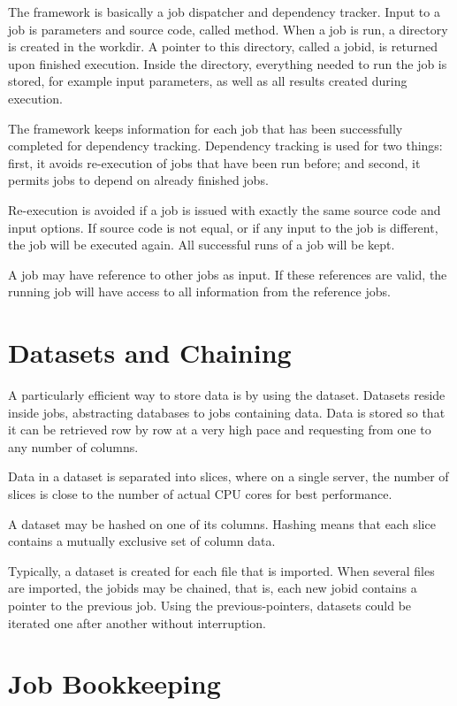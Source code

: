 The framework is basically a job dispatcher and dependency tracker.
Input to a job is parameters and source code, called method.  When a
job is run, a directory is created in the workdir.  A pointer to this
directory, called a jobid, is returned upon finished execution.
Inside the directory, everything needed to run the job is stored, for
example input parameters, as well as all results created during
execution.

The framework keeps information for each job that has been
successfully completed for dependency tracking.  Dependency tracking
is used for two things: first, it avoids re-execution of jobs that
have been run before; and second, it permits jobs to depend on already
finished jobs.

Re-execution is avoided if a job is issued with exactly the same
source code and input options.  If source code is not equal, or if any
input to the job is different, the job will be executed again.  All
successful runs of a job will be kept.

A job may have reference to other jobs as input.  If these references
are valid, the running job will have access to all information from
the reference jobs.



\section{Datasets and Chaining}

A particularly efficient way to store data is by using the dataset.
Datasets reside inside jobs, abstracting databases to jobs containing
data.  Data is stored so that it can be retrieved row by row at a very
high pace and requesting from one to any number of columns.

Data in a dataset is separated into slices, where on a single server,
the number of slices is close to the number of actual CPU cores for
best performance.

A dataset may be hashed on one of its columns.  Hashing means that
each slice contains a mutually exclusive set of column data.

Typically, a dataset is created for each file that is imported.  When
several files are imported, the jobids may be chained, that is, each
new jobid contains a pointer to the previous job.  Using the
previous-pointers, datasets could be iterated one after another
without interruption.



\section{Job Bookkeeping}

